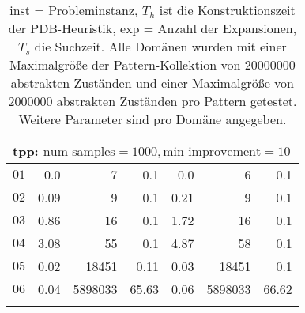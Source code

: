 \begin{longtable}{|c||r|r|r||r|r|r|}
\multicolumn{7}{|l|}{tpp: $\text{num-samples}=1000,\text{min-improvement}=10$}\\\hline
$01$ & 0.0 & 7 & 0.1 &0.0 & 6 & 0.1 \\\hline
$02$ & 0.09 & 9 & 0.1 &0.21 & 9 & 0.1 \\\hline
$03$ & 0.86 & 16 & 0.1 &1.72 & 16 & 0.1 \\\hline
$04$ & 3.08 & 55 & 0.1 &4.87 & 58 & 0.1 \\\hline
$05$ & 0.02 & 18451 & 0.11 &0.03 & 18451 & 0.1 \\\hline
$06$ & 0.04 & 5898033 & 65.63 &0.06 & 5898033 & 66.62 \\\hline

\caption{inst = Probleminstanz, $T_h$ ist die Konstruktionszeit der PDB-Heuristik, exp = Anzahl der Expansionen, $T_s$
die Suchzeit. Alle Domänen wurden mit einer Maximalgröße der Pattern-Kollektion von $20000000$ abstrakten Zuständen und 
einer Maximalgröße von $2000000$ abstrakten Zuständen pro Pattern getestet. Weitere Parameter sind pro Domäne angegeben.}
\end{longtable}